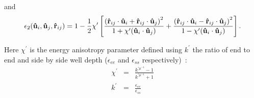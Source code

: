 and
\begin{equation}
	\epsilon_2(\mathbf{\hat{u} }_i,\mathbf{\hat{u} }_j,\mathbf{\hat{r} }_{ij}) = 
	1 - \frac{1}{2}\chi^\prime \left[ 
	\frac{ \left(\mathbf{\hat{r} }_{ij} \cdot \mathbf{\hat{u} }_i + \mathbf{\hat{r} }_{ij} \cdot \mathbf{\hat{u} }_j\right)^2 }{1 + \chi^\prime(\mathbf{\hat{u} }_i \cdot \mathbf{\hat{u} }_j)}
      + \frac{ \left(\mathbf{\hat{r} }_{ij} \cdot \mathbf{\hat{u} }_i - \mathbf{\hat{r} }_{ij} \cdot \mathbf{\hat{u} }_j\right)^2 }{1 - \chi^\prime(\mathbf{\hat{u} }_i \cdot \mathbf{\hat{u} }_j)}
	\right].
\end{equation}

Here $\chi^\prime$ is the energy anisotropy parameter defined using $k^\prime$ the ratio of end to
end and side by side well depth ($\epsilon_{ee}$ and $\epsilon_{ss}$ respectively)~:
\begin{eqnarray}
	\chi^{\prime} &=& \frac{k^{\prime \mu^{-1}} - 1}{k^{\prime \mu^{-1}} + 1}	\\
	k^\prime &=& \frac{\epsilon_{ee}}{\epsilon_{ss}}	\nonumber
\end{eqnarray}

